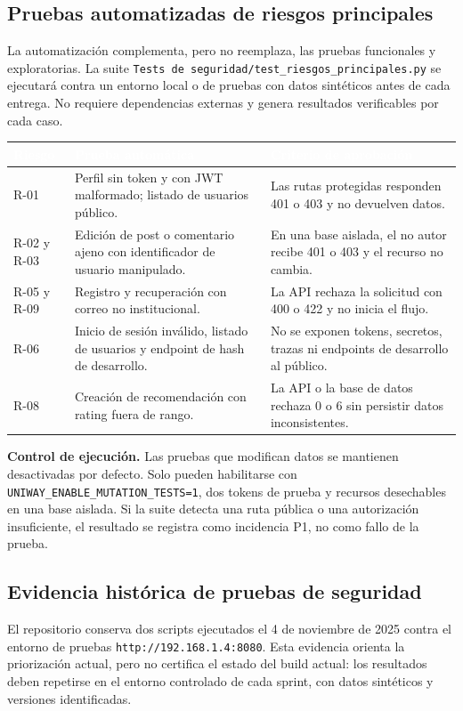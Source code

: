 \documentclass[11pt,a4paper]{article}
\newcommand{\thead}[1]{\textcolor{white}{\textbf{#1}}}
\begin{document}
\subsection{Pruebas automatizadas de riesgos principales}
La automatización complementa, pero no reemplaza, las pruebas funcionales y exploratorias. La suite \texttt{Tests de seguridad/test\_riesgos\_principales.py} se ejecutará contra un entorno local o de pruebas con datos sintéticos antes de cada entrega. No requiere dependencias externas y genera resultados verificables por cada caso.

\begin{tabularx}{\textwidth}{p{2.2cm}p{7.0cm}Y}
\thead{Riesgo} & \thead{Prueba automática} & \thead{Criterio de aprobación}\\
\midrule
R-01 & Perfil sin token y con JWT malformado; listado de usuarios público. & Las rutas protegidas responden 401 o 403 y no devuelven datos.\\
R-02 y R-03 & Edición de post o comentario ajeno con identificador de usuario manipulado. & En una base aislada, el no autor recibe 401 o 403 y el recurso no cambia.\\
R-05 y R-09 & Registro y recuperación con correo no institucional. & La API rechaza la solicitud con 400 o 422 y no inicia el flujo.\\
R-06 & Inicio de sesión inválido, listado de usuarios y endpoint de hash de desarrollo. & No se exponen tokens, secretos, trazas ni endpoints de desarrollo al público.\\
R-08 & Creación de recomendación con rating fuera de rango. & La API o la base de datos rechaza 0 o 6 sin persistir datos inconsistentes.\\
\end{tabularx}

\medskip
\noindent\textbf{Control de ejecución.} Las pruebas que modifican datos se mantienen desactivadas por defecto. Solo pueden habilitarse con \texttt{UNIWAY\_ENABLE\_MUTATION\_TESTS=1}, dos tokens de prueba y recursos desechables en una base aislada. Si la suite detecta una ruta pública o una autorización insuficiente, el resultado se registra como incidencia P1, no como fallo de la prueba.

\subsection{Evidencia histórica de pruebas de seguridad}
El repositorio conserva dos scripts ejecutados el 4 de noviembre de 2025 contra el entorno de pruebas \texttt{http://192.168.1.4:8080}. Esta evidencia orienta la priorización actual, pero no certifica el estado del build actual: los resultados deben repetirse en el entorno controlado de cada sprint, con datos sintéticos y versiones identificadas.
\end{document}
